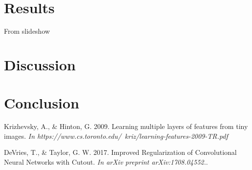 \documentclass{article}
\begin{document}
\begin{multicols*}{2}
\section{Results}
	From slideshow

\section{Discussion}

\section{Conclusion}
	
\begin{thebibliography}{9}
Krizhevsky, A., \& Hinton, G. 2009. 
Learning multiple layers of features from tiny images.
\textit{In https://www.cs.toronto.edu/~kriz/learning-features-2009-TR.pdf}
 
DeVries, T., \& Taylor, G. W. 2017.
Improved Regularization of Convolutional Neural Networks with Cutout.
\textit{In arXiv preprint arXiv:1708.04552.}.
\end{thebibliography}

\end{multicols*}
\end{document}
